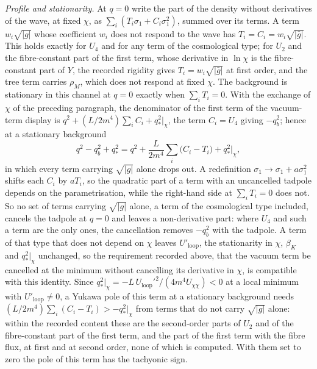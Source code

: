 \emph{Profile and stationarity.} At \(q=0\) write the part of the density without derivatives of the wave, at fixed \(\chi\), as \(\sum_i(T_i\sigma_1+C_i\sigma_1^2)\), summed over its terms. A term \(w_i\sqrt{|g|}\) whose coefficient \(w_i\) does not respond to the wave has \(T_i=C_i=w_i\sqrt{|\bar g|}\). This holds exactly for \(U_4\) and for any term of the cosmological type; for \(U_2\) and the fibre-constant part of the first term, whose derivative in \(\ln\chi\) is the fibre-constant part of \(Y\), the recorded rigidity gives \(T_i=w_i\sqrt{|\bar g|}\) at first order, and the tree term carries \(\rho_M\), which does not respond at fixed \(\chi\). The background is stationary in this channel at \(q=0\) exactly when \(\sum_iT_i=0\). With the exchange of \(\chi\) of the preceding paragraph, the denominator of the first term of the vacuum-term display is \(q^2+(L/2m^4)\sum_iC_i+q_*^2|_\chi\), the term \(C_i=U_4\) giving \(-q_b^2\); hence at a stationary background
\[
q^2-q_b^2+q_*^2=q^2+\frac{L}{2m^4}\sum_i\bigl(C_i-T_i\bigr)+q_*^2\big|_\chi ,
\]
in which every term carrying \(\sqrt{|g|}\) alone drops out. A redefinition \(\sigma_1\to\sigma_1+a\sigma_1^2\) shifts each \(C_i\) by \(aT_i\), so the quadratic part of a term with an uncancelled tadpole depends on the parametrisation, while the right-hand side at \(\sum_iT_i=0\) does not. So no set of terms carrying \(\sqrt{|g|}\) alone, a term of the cosmological type included, cancels the tadpole at \(q=0\) and leaves a non-derivative part: where \(U_4\) and such a term are the only ones, the cancellation removes \(-q_b^2\) with the tadpole. A term of that type that does not depend on \(\chi\) leaves \(U'_{\mathrm{loop}}\), the stationarity in \(\chi\), \(\beta_K\) and \(q_*^2|_\chi\) unchanged, so the requirement recorded above, that the vacuum term be cancelled at the minimum without cancelling its derivative in \(\chi\), is compatible with this identity. Since \(q_*^2|_\chi=-L\,U_{\mathrm{loop}}'^2/(4m^4U_{\chi\chi})<0\) at a local minimum with \(U'_{\mathrm{loop}}\ne0\), a Yukawa pole of this term at a stationary background needs \((L/2m^4)\sum_i(C_i-T_i)>-q_*^2|_\chi\) from terms that do not carry \(\sqrt{|g|}\) alone: within the recorded content these are the second-order parts of \(U_2\) and of the fibre-constant part of the first term, and the part of the first term with the fibre flux, at first and at second order, none of which is computed. With them set to zero the pole of this term has the tachyonic sign.

